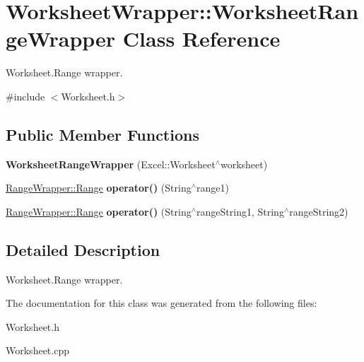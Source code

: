 \hypertarget{class_worksheet_wrapper_1_1_worksheet_range_wrapper}{}\section{Worksheet\+Wrapper\+:\+:Worksheet\+Range\+Wrapper Class Reference}
\label{class_worksheet_wrapper_1_1_worksheet_range_wrapper}


Worksheet.\+Range wrapper.  




{\ttfamily \#include $<$Worksheet.\+h$>$}

\subsection*{Public Member Functions}
\begin{DoxyCompactItemize}
\item 
\hypertarget{class_worksheet_wrapper_1_1_worksheet_range_wrapper_aecd3df8ab768dd78f126b0bb81446e78}{}{\bfseries Worksheet\+Range\+Wrapper} (Excel\+::\+Worksheet$^\wedge$worksheet)\label{class_worksheet_wrapper_1_1_worksheet_range_wrapper_aecd3df8ab768dd78f126b0bb81446e78}

\item 
\hypertarget{class_worksheet_wrapper_1_1_worksheet_range_wrapper_a52c50b0a376449e8119ee8f00d806f13}{}\hyperlink{class_range_wrapper_1_1_range}{Range\+Wrapper\+::\+Range} {\bfseries operator()} (String$^\wedge$range1)\label{class_worksheet_wrapper_1_1_worksheet_range_wrapper_a52c50b0a376449e8119ee8f00d806f13}

\item 
\hypertarget{class_worksheet_wrapper_1_1_worksheet_range_wrapper_af33e603a1c3b0f7f3483795dd7629b20}{}\hyperlink{class_range_wrapper_1_1_range}{Range\+Wrapper\+::\+Range} {\bfseries operator()} (String$^\wedge$range\+String1, String$^\wedge$range\+String2)\label{class_worksheet_wrapper_1_1_worksheet_range_wrapper_af33e603a1c3b0f7f3483795dd7629b20}

\end{DoxyCompactItemize}


\subsection{Detailed Description}
Worksheet.\+Range wrapper. 

The documentation for this class was generated from the following files\+:\begin{DoxyCompactItemize}
\item 
Worksheet.\+h\item 
Worksheet.\+cpp\end{DoxyCompactItemize}
